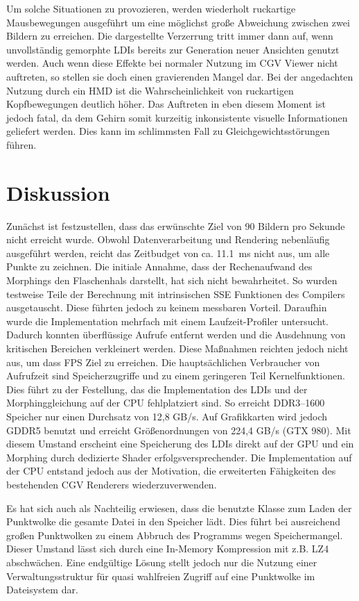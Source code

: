 \documentclass[hyperref, beleg, german]{cgvpub}
\begin{document}
Um solche Situationen zu provozieren, werden wiederholt
ruckartige Mausbewegungen ausgeführt um eine möglichst große Abweichung
zwischen zwei Bildern zu erreichen. Die dargestellte Verzerrung tritt immer
dann auf, wenn unvollständig gemorphte LDIs bereits zur Generation neuer
Ansichten genutzt werden. Auch wenn diese Effekte bei normaler Nutzung im CGV
Viewer nicht auftreten, so stellen sie doch einen gravierenden Mangel dar. Bei
der angedachten Nutzung durch ein HMD ist die Wahrscheinlichkeit von
ruckartigen Kopfbewegungen deutlich höher. Das Auftreten in eben diesem Moment
ist jedoch fatal, da dem Gehirn somit kurzeitig inkonsistente visuelle
Informationen geliefert werden. Dies kann im schlimmsten Fall zu
Gleichgewichtsstörungen führen.

\section{Diskussion}%
\label{sec:discussion}

Zunächst ist festzustellen, dass das erwünschte Ziel von 90 Bildern pro Sekunde
nicht erreicht wurde. Obwohl Datenverarbeitung und Rendering nebenläufig
ausgeführt werden, reicht das Zeitbudget von ca. \SI{11,1}{\milli\second} nicht
aus, um alle Punkte zu zeichnen. Die initiale Annahme, dass der Rechenaufwand
des Morphings den Flaschenhals darstellt, hat sich nicht bewahrheitet. So
wurden testweise Teile der Berechnung mit intrinsischen SSE Funktionen des
Compilers ausgetauscht. Diese führten jedoch zu keinem messbaren Vorteil.
Daraufhin wurde die Implementation mehrfach mit einem Laufzeit-Profiler
untersucht. Dadurch konnten überflüssige Aufrufe entfernt werden und die
Ausdehnung von kritischen Bereichen verkleinert werden. Diese Maßnahmen
reichten jedoch nicht aus, um dass FPS Ziel zu erreichen. Die hauptsächlichen
Verbraucher von Aufrufzeit sind Speicherzugriffe und zu einem geringeren Teil
Kernelfunktionen. Dies führt zu der Festellung, das die Implementation des LDIs
und der Morphinggleichung auf der CPU fehlplatziert sind. So erreicht
DDR3--1600 Speicher nur einen Durchsatz von 12,8 GB/s. Auf Grafikkarten wird
jedoch GDDR5 benutzt und erreicht Größenordnungen von 224,4 GB/s (GTX 980). Mit
diesem Umstand erscheint eine Speicherung des LDIs direkt auf der GPU und ein
Morphing durch dedizierte Shader erfolgsversprechender. Die Implementation auf
der CPU entstand jedoch aus der Motivation, die erweiterten Fähigkeiten des
bestehenden CGV Renderers wiederzuverwenden.

Es hat sich auch als Nachteilig erwiesen, dass die benutzte Klasse zum Laden
der Punktwolke die gesamte Datei in den Speicher lädt. Dies führt bei
ausreichend großen Punktwolken zu einem Abbruch des Programms wegen
Speichermangel. Dieser Umstand lässt sich durch eine In-Memory Kompression mit
z.B. LZ4 abschwächen. Eine endgültige Lösung stellt jedoch nur die Nutzung
einer Verwaltungsstruktur für quasi wahlfreien Zugriff auf eine Punktwolke im
Dateisystem dar.
\end{document}
